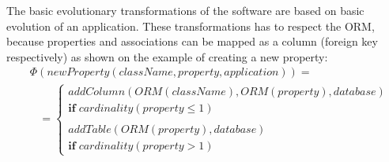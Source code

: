 \documentclass[runningheads]{comsis}
\begin{document}
The basic evolutionary transformations of the software are based on basic evolution of an application. These transformations has to respect the ORM, because properties and associations can be mapped as a column (foreign key respectively) as shown on the example of creating a new property: 
\begin{align}
& \Phi(newProperty(className, property, application)) = \nonumber \\
& \;\;\; =  \begin{cases}
  addColumn(ORM(className), ORM(property), database) \\\mathbf{if} \; cardinality(property \leq 1)  \\\\
  addTable(ORM(property), database) \\
  \mathbf{if} \; cardinality(property > 1)  
 \end{cases}
\end{align}
\end{document}
